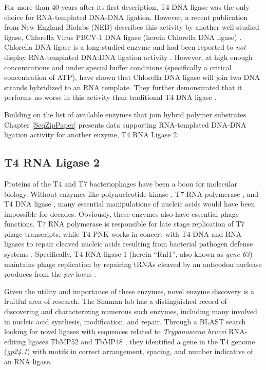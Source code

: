     For more than 40 years after its first description, T4 DNA ligase was the only choice for RNA-templated DNA-DNA ligation. However, a recent publication from New England Biolabs (NEB) describes this activity by another well-studied ligase, Chlorella Virus PBCV-1 DNA ligase (herein Chlorella DNA ligase) \citep{Lohman2013c}. Chlorella DNA ligase is a long-studied enzyme and had been reported to \textit{not} display RNA-templated DNA:DNA ligation activity \citep{Ho1997b,Sriskanda1998c}. However, at high enough concentrations and under special buffer conditions (specifically a critical concentration of ATP), \citet{Lohman2013c} have shown that Chlorella DNA ligase will join two DNA strands hybridized to an RNA template. They further demonstrated that it performs no worse in this activity than traditional T4 DNA ligase \citep{Nilsson2001,Yeakley2002}.

    Building on the list of available enzymes that join hybrid polymer substrates Chapter \ref{SeqZipPaper} presents data supporting RNA-templated DNA-DNA ligation activity for another enzyme, T4 RNA Ligase 2.

  \subsection{T4 RNA Ligase 2}
    \label{Intro:subsec:Rnl2}

    Proteins of the T4 and T7 bacteriophages have been a boon for molecular biology. Without enzymes like polynucleotide kinase \citep{Richardson1965a}, T7 RNA polymerase \citep{Summers1970b}, and T4 DNA ligase \citep{Weiss1967a}, many essential manipulations of nucleic acids would have been impossible for decades. Obviously, these enzymes also have essential phage functions. T7 RNA polymerase is responsible for late stage replication of T7 phage transcripts, while T4 PNK works in concert with T4 DNA and RNA ligases to repair cleaved nucleic acids resulting from bacterial pathogen defense systems \citep{Wang2002b}. Specifically, T4 RNA ligase 1 (herein ``Rnl1'', also known as \textit{gene 63}) maintains phage replication by repairing tRNAs cleaved by an anticodon nuclease produces from the \textit{prr} locus \citep{Amitsur1987d}.

    Given the utility and importance of these enzymes, novel enzyme discovery is a fruitful area of research. The Shuman lab has a distinguished record of discovering and characterizing numerous such enzymes, including many involved in nucleic acid synthesis, modification, and repair. Through a BLAST search looking for novel ligases with sequences related to \textit{Trypanosoma brucei} RNA-editing ligases TbMP52 and TbMP48 \citep{Ho2002b}, they identified a gene in the T4 genome (\textit{gp24.1}) with motifs in correct arrangement, spacing, and number indicative of an RNA ligase.

